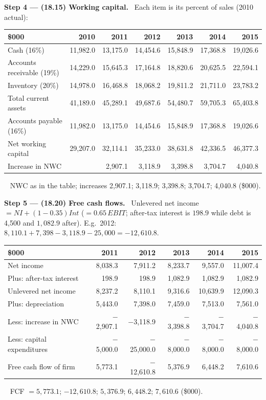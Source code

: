 \documentclass[11pt,a4paper]{article}
\newcommand{\step}[2]{\par\medskip\noindent\textbf{Step #1 --- #2.}~}
\newcommand{\answer}[1]{\par\smallskip\noindent\fbox{\textbf{Answer #1.}}~}
\begin{document}
\step{4}{(18.15) Working capital} Each item is its percent of sales (2010 actual):
\begin{center}\small
\begin{tabular}{lrrrrrr}
\toprule
\$000 & 2010 & 2011 & 2012 & 2013 & 2014 & 2015\\
\midrule
Cash (16\%) & 11,982.0 & 13,175.0 & 14,454.6 & 15,848.9 & 17,368.8 & 19,026.6\\
Accounts receivable (19\%) & 14,229.0 & 15,645.3 & 17,164.8 & 18,820.6 & 20,625.5 & 22,594.1\\
Inventory (20\%) & 14,978.0 & 16,468.8 & 18,068.2 & 19,811.2 & 21,711.0 & 23,783.2\\
Total current assets & 41,189.0 & 45,289.1 & 49,687.6 & 54,480.7 & 59,705.3 & 65,403.8\\
Accounts payable (16\%) & 11,982.0 & 13,175.0 & 14,454.6 & 15,848.9 & 17,368.8 & 19,026.6\\
Net working capital & 29,207.0 & 32,114.1 & 35,233.0 & 38,631.8 & 42,336.5 & 46,377.3\\
Increase in NWC & & 2,907.1 & 3,118.9 & 3,398.8 & 3,704.7 & 4,040.8\\
\bottomrule
\end{tabular}
\end{center}
\answer{(18.15)} NWC as in the table; increases 2,907.1; 3,118.9; 3,398.8; 3,704.7; 4,040.8 (\$000).

\step{5}{(18.20) Free cash flows} Unlevered net income $=NI+(1-0.35)Int$ ($=0.65\,EBIT$; after-tax
interest is $198.9$ while debt is 4,500 and $1{,}082.9$ after). E.g.\ 2012:
$8{,}110.1+7{,}398-3{,}118.9-25{,}000=-12{,}610.8$.
\begin{center}\small
\begin{tabular}{lrrrrr}
\toprule
\$000 & 2011 & 2012 & 2013 & 2014 & 2015\\
\midrule
Net income & 8,038.3 & 7,911.2 & 8,233.7 & 9,557.0 & 11,007.4\\
Plus: after-tax interest & 198.9 & 198.9 & 1,082.9 & 1,082.9 & 1,082.9\\
Unlevered net income & 8,237.2 & 8,110.1 & 9,316.6 & 10,639.9 & 12,090.3\\
Plus: depreciation & 5,443.0 & 7,398.0 & 7,459.0 & 7,513.0 & 7,561.0\\
Less: increase in NWC & $-$2,907.1 & $-$3,118.9 & $-$3,398.8 & $-$3,704.7 & $-$4,040.8\\
Less: capital expenditures & $-$5,000.0 & $-$25,000.0 & $-$8,000.0 & $-$8,000.0 & $-$8,000.0\\
Free cash flow of firm & 5,773.1 & $-$12,610.8 & 5,376.9 & 6,448.2 & 7,610.6\\
\bottomrule
\end{tabular}
\end{center}
\answer{(18.20)} FCF $=5{,}773.1$; $-12{,}610.8$; $5{,}376.9$; $6{,}448.2$; $7{,}610.6$ (\$000).
\end{document}
